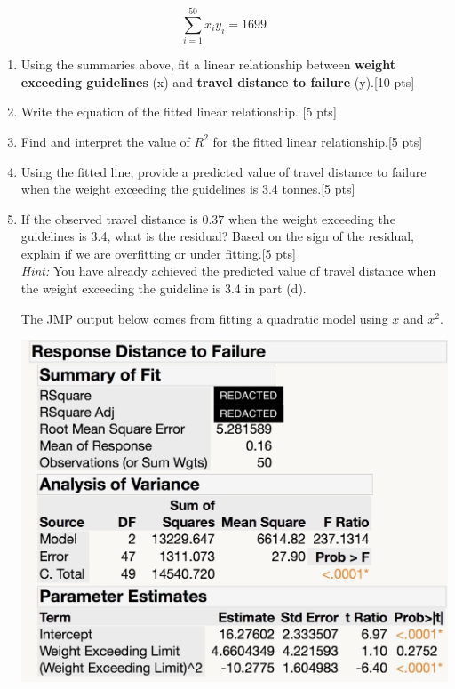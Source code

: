 \documentclass[11pt]{article}\usepackage[]{graphicx}\usepackage[]{color}
\begin{document}
\begin{enumerate}
$$
\sum_{i=1}^{50} x_i y_i = 1699
$$

\begin{enumerate}
       \item  Using the summaries above, fit a linear relationship between \textbf{weight exceeding guidelines} (x) and \textbf{travel distance to failure} (y).[10 pts]
   

      \item Write the equation of the fitted linear relationship. [5 pts] 
      
      \item Find and \underline{interpret} the value of $R^2$ for the fitted linear relationship.[5 pts]
      
      \item Using the fitted line, provide a predicted value of travel distance to failure when the weight exceeding the guidelines is 3.4 tonnes.[5 pts]
      \item If the observed travel distance is $0.37$ when the weight exceeding the guidelines is 3.4, what is the residual? Based on the sign of the residual, explain if we are overfitting or under fitting.[5 pts]\\
      \emph{Hint:} You have already achieved the predicted value of travel distance when the weight exceeding the guideline is 3.4 in part (d).

%
\vspace{0.3cm}
The JMP output below comes from fitting a quadratic model using $x$ and $x^2$.
\vspace{0.3cm}
    
    \includegraphics[scale=.2]{FitModel}


\end{enumerate}
\end{enumerate}
\end{document}
